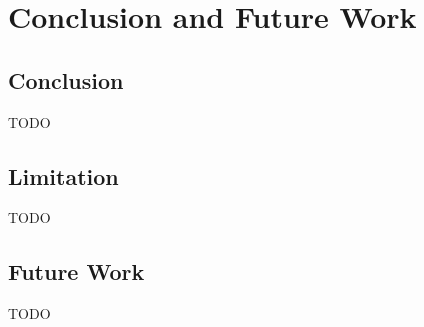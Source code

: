 \chapter{Conclusion and Future Work}


\section{Conclusion}

TODO

\section{Limitation}

TODO

\section{Future Work}

TODO
